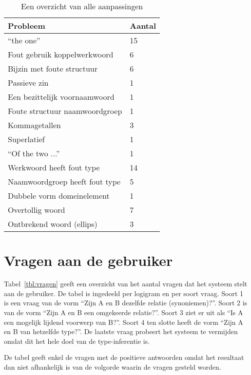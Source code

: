\begin{table}[h]
  \centering
  \begin{tabular}{ll}
    \toprule
    \textbf{Probleem} & \textbf{Aantal} \\ 
    \hline
    ``the one'' & 15 \\
    Fout gebruik koppelwerkwoord & 6 \\
    Bijzin met foute structuur & 6 \\
    Passieve zin & 1 \\
    Een bezittelijk voornaamwoord & 1 \\
    Foute structuur naamwoordgroep & 1 \\
    \hline
    Kommagetallen & 3 \\
    Superlatief & 1 \\
    ``Of the two ...'' & 1 \\
    \hline
    Werkwoord heeft fout type & 14 \\
    Naamwoordgroep heeft fout type & 5 \\
    \hline
    Dubbele vorm domeinelement & 1 \\
    \hline
    Overtollig woord & 7 \\
    Ontbrekend woord (ellips) & 3 \\
    \bottomrule
  \end{tabular}
  \caption{Een overzicht van alle aanpassingen}
  \label{tbl:resultaten}
\end{table}

\section{Vragen aan de gebruiker}
Tabel~\ref{tbl:vragen} geeft een overzicht van het aantal vragen dat het systeem stelt aan de gebruiker. De tabel is ingedeeld per logigram en per soort vraag. Soort 1 is een vraag van de vorm ``Zijn A en B dezelfde relatie (synoniemen)?''. Soort 2 is van de vorm ``Zijn A en B een omgekeerde relatie?''. Soort 3 ziet er uit als ``Is A een mogelijk lijdend voorwerp van B?''. Soort 4 ten slotte heeft de vorm ``Zijn A en B van hetzelfde type?''. De laatste vraag probeert het systeem te vermijden omdat dit het hele doel van de type-inferentie is.

De tabel geeft enkel de vragen met de positieve antwoorden omdat het resultaat dan niet afhankelijk is van de volgorde waarin de vragen gesteld worden.

